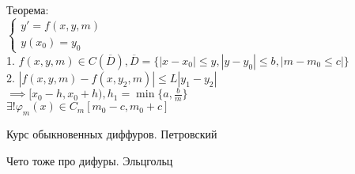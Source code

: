 \documentclass[12pt, a4paper]{article}
\begin{document}
Теорема:\\

$\left\{
\begin{matrix}
y' = f(x, y, m)\\ y(x_0) = y_0
\end{matrix}\right.
$\\

1. $f(x,y,m) \in C(\overline{D}), \overline{D} = \{ |x-x_0| \le y, |y-y_0| \le b, |m - m_0 \le c| \} $\\
2. $|f(x,y,m) - f(x,y_2,m)| \le L|y_1 - y_2|$\\
$\implies [x_0 - h, x_0 + h), h_1 = \min\{a, \frac{b}{m}\}$\\
$\exists!\varphi_m(x) \in C_m[m_0-c, m_0+c]$\\

\begin{list}{•}{Литература:}
\item Курс обыкновенных диффуров. Петровский
\item Чето тоже про дифуры. Эльцгольц
\end{list}
 
 
\end{document}

